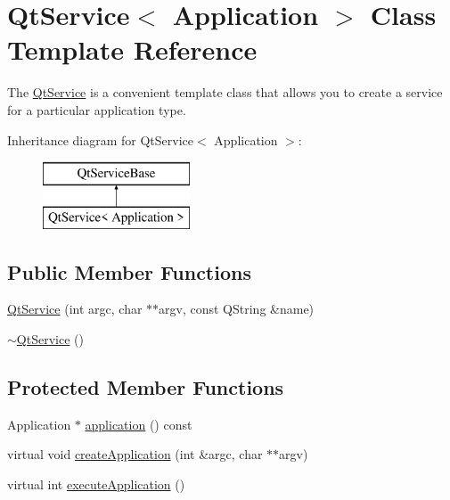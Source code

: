 \hypertarget{class_qt_service}{}\section{Qt\+Service$<$ Application $>$ Class Template Reference}
\label{class_qt_service}


The \hyperlink{class_qt_service}{Qt\+Service} is a convenient template class that allows you to create a service for a particular application type.  


Inheritance diagram for Qt\+Service$<$ Application $>$\+:\begin{figure}[H]
\begin{center}
\leavevmode
\includegraphics[height=2.000000cm]{class_qt_service}
\end{center}
\end{figure}
\subsection*{Public Member Functions}
\begin{DoxyCompactItemize}
\item 
\hyperlink{class_qt_service_aca39304919f89cbb95fca64f44a761ae}{Qt\+Service} (int argc, char $\ast$$\ast$argv, const Q\+String \&name)
\item 
\hyperlink{class_qt_service_a96af408261dfa13bd8034f67949d6c2d}{$\sim$\+Qt\+Service} ()
\end{DoxyCompactItemize}
\subsection*{Protected Member Functions}
\begin{DoxyCompactItemize}
\item 
Application $\ast$ \hyperlink{class_qt_service_a39743415a6ece5c7c6e6b5b01289c00b}{application} () const
\item 
virtual void \hyperlink{class_qt_service_a50aa2079345abfd0b1284be47e245b0b}{create\+Application} (int \&argc, char $\ast$$\ast$argv)
\item 
virtual int \hyperlink{class_qt_service_a84f5f60304117e1f11cc0ed16dc0b72e}{execute\+Application} ()
\end{DoxyCompactItemize}

